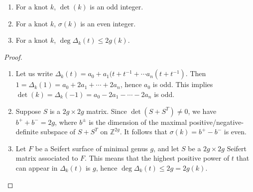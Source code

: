 \begin{cor}
\sloppyspace
\begin{enumerate}
	\item For a knot $k$, $\det(k)$ is an odd integer.
	\item For a knot $k$, $\sigma(k)$ is an even integer.
	\item For a knot $k$, $\deg \Delta_k(t) \leq 2g(k)$.
\end{enumerate}
\end{cor}
\begin{proof}
\sloppyspace
\begin{enumerate}
	\item Let us write $\Delta_k(t) = a_0+a_1(t+t^{-1} + \cdots a_n(t+t^{-1})$. Then $1=\Delta_k(1) = a_0+2a_1+\cdots+2a_n$, hence $a_0$ is odd. This implies $\det(k)=\Delta_k(-1)=a_0-2a_1-\cdots-2a_n$ is odd.
	\item Suppose $S$ is a $2g \times 2g$ matrix. Since $\det(S+S^T) \neq 0$, we have $b^++b^-=2g$, where $b^\pm$ is the dimension of the maximal positive/negative-definite subspace of $S+S^T$ on $\mathbb Z^{2g}$. It follows that $\sigma(k)=b^+-b^-$ is even.
	\item Let $F$ be a Seifert surface of minimal genus $g$, and let $S$ be a $2g \times 2g$ Seifert matrix associated to $F$. This means that the highest positive power of $t$ that can appear in $\Delta_k(t)$ is $g$, hence $\deg \Delta_k(t) \leq 2g = 2g(k)$.
\end{enumerate}
\end{proof}

